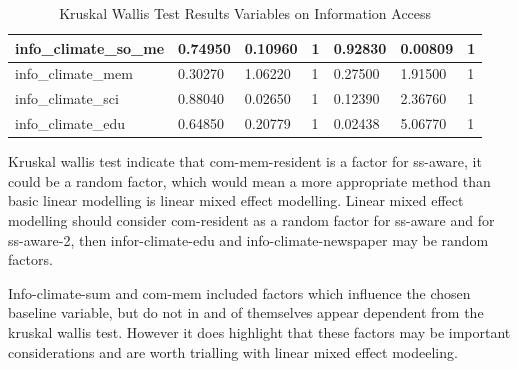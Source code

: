 \begin{table}[h]
\begin{tabular}{|l|l|l|l|l|l|l|}
        info\_climate\_so\_me & 0.74950 & 0.10960 & 1 & 0.92830 & 0.00809 & 1 \\ \hline
        info\_climate\_mem & 0.30270 & 1.06220 & 1 & 0.27500 & 1.91500 & 1 \\ \hline
        info\_climate\_sci & 0.88040 & 0.02650 & 1 & 0.12390 & 2.36760 & 1 \\ \hline
        info\_climate\_edu & 0.64850 & 0.20779 & 1 & \cellcolor[HTML]{7df9ff} 0.02438 & 5.06770 & 1 \\ \hline
    \end{tabular}
    \caption{Kruskal Wallis Test Results Variables on Information Access}
    \label{Kruskal_wallis_test_information}
\end{table}

Kruskal wallis test indicate that com-mem-resident is a factor for ss-aware, it could be a random factor, which would mean a more appropriate method than basic linear modelling is linear mixed effect modelling. Linear mixed effect modelling should consider com-resident as a random factor for ss-aware and for ss-aware-2, then infor-climate-edu and info-climate-newspaper may be random factors.

Info-climate-sum and com-mem included factors which influence the chosen baseline variable, but do not in and of themselves appear dependent from the kruskal wallis test. However it does highlight that these factors may be important considerations and are worth trialling with linear mixed effect modeeling.





